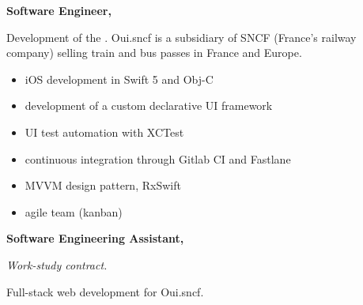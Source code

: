 \documentclass{cv}
\begin{document}
\noindent\begin{minipage}[t]{.65\textwidth}


\newlength{\logoboxwidth}
\setlength{\logoboxwidth}{20mm}

\begin{mainexpbox}[title=nov. 2019 -- today]

	\begin{minipage}[t]{\logoboxwidth}%
	\centering
	\end{minipage}
	\begin{minipage}[t]{0.8\textwidth}

	\textbf{Software Engineer, \evtech{}}\smallskip

	Development of the \href{https://apps.apple.com/fr/app/oui-sncf-train-et-bus/id343889987}{}.  Oui.sncf is a subsidiary of SNCF (France's railway company) selling train and bus passes in France and Europe.

	\begin{itemize}
		\item iOS development in Swift 5 and Obj-C
		\item development of a custom declarative UI framework
		\item UI test automation with XCTest
		\item continuous integration through Gitlab CI and Fastlane
		\item MVVM design pattern, RxSwift
		\item agile team (kanban)
	\end{itemize}
	\end{minipage}

\end{mainexpbox}

\begin{expbox}[title={dec. 2016, \faicon{clock-o} 3 years}]

	\begin{minipage}[t]{\logoboxwidth}%
	\centering
	\end{minipage}
	\begin{minipage}[t]{0.8\textwidth}

	\textbf{Software Engineering Assistant, \evtech{}}\smallskip

	\textit{Work-study contract.} 

	Full-stack web development for Oui.sncf.


\end{minipage}
\end{expbox}
\end{minipage}
\end{document}

